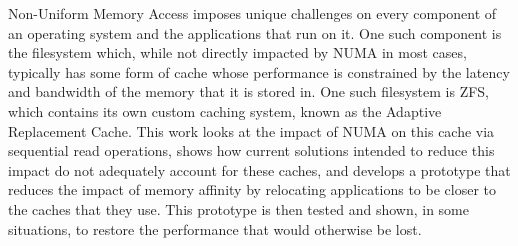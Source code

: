 Non-Uniform Memory Access imposes unique challenges on every component of an operating system and the applications that run on it.
One such component is the filesystem which, while not directly impacted by NUMA in most cases, 
typically has some form of cache whose performance is constrained by the latency and bandwidth of the memory that it is stored in.
One such filesystem is ZFS, which contains its own custom caching system, known as the Adaptive Replacement Cache.
This work looks at the impact of NUMA on this cache via sequential read operations, 
shows how current solutions intended to reduce this impact do not adequately account for these caches,
and develops a prototype that reduces the impact of memory affinity by relocating applications to be closer to the caches that they use. 
This prototype is then tested and shown, in some situations, to restore the performance that would otherwise be lost.



